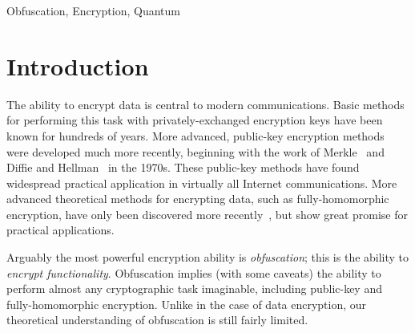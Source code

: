 \documentclass[envcountsame]{llncs}
\numberwithin{equation}{section}
\begin{document}
\begin{keywords}
Obfuscation, Encryption, Quantum \end{keywords}


\section{Introduction}\label{sec:intro}

The ability to encrypt data is central to modern communications. Basic methods for performing this task with privately-exchanged encryption keys have been known for hundreds of years. More advanced, public-key encryption methods were developed much more recently, beginning with the work of Merkle~\cite{Merkle78} and Diffie and Hellman~\cite{DH76} in the 1970s. These public-key methods have found widespread practical application in virtually all Internet communications. More advanced theoretical methods for encrypting data, such as fully-homomorphic encryption, have only been discovered more recently~\cite{Gentry09}, but show great promise for practical applications.

Arguably the most powerful encryption ability is \emph{obfuscation}; this is the ability to \emph{encrypt functionality}. Obfuscation implies (with some caveats) the ability to perform almost any cryptographic task imaginable, including public-key and fully-homomorphic encryption. Unlike in the case of data encryption, our theoretical understanding of obfuscation is still fairly limited. 
\end{document}
